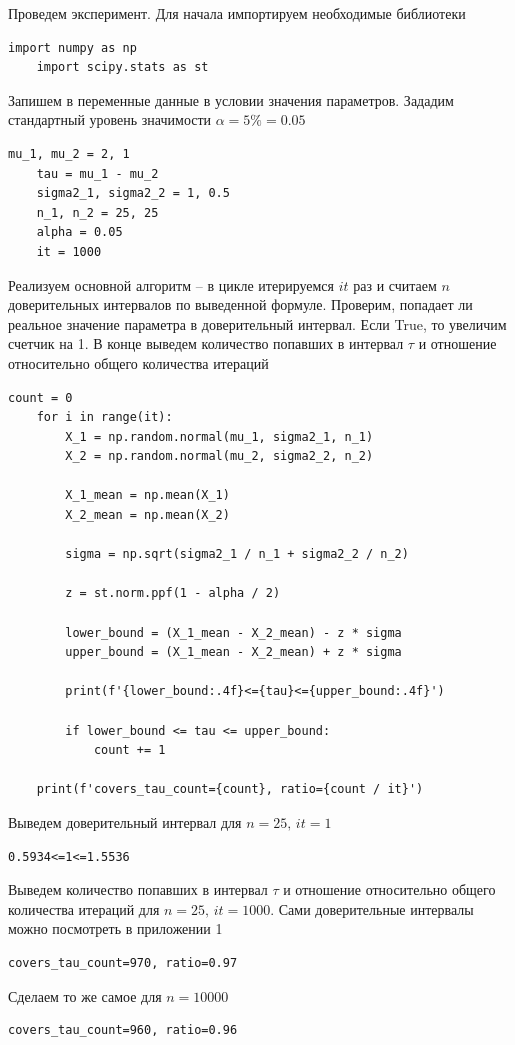 \documentclass[a4paper, 12pt]{article}
\begin{document}
    Проведем эксперимент. Для начала импортируем необходимые библиотеки
    \begin{lstlisting}[label=imps1, caption={Импортирование необходимых библиотек}]
    import numpy as np
    import scipy.stats as st
    \end{lstlisting}
    Запишем в переменные данные в условии значения параметров. Зададим стандартный уровень значимости $\alpha=5\%=0.05$
    \begin{lstlisting}[label=vars, caption={Задаем данные по условию}]
    mu_1, mu_2 = 2, 1
    tau = mu_1 - mu_2
    sigma2_1, sigma2_2 = 1, 0.5
    n_1, n_2 = 25, 25
    alpha = 0.05
    it = 1000
    \end{lstlisting}
    Реализуем основной алгоритм -- в цикле итерируемся $it$ раз и считаем $n$ доверительных интервалов по выведенной формуле.
    Проверим, попадает ли реальное значение параметра в доверительный интервал. Если True, то увеличим счетчик на 1. В конце
    выведем количество попавших в интервал $\tau$ и отношение относительно общего количества итераций
    \begin{lstlisting}[label=code1, caption={Код для подсчета доверительных интервалов и кол-ва попаданий}]
    count = 0
    for i in range(it):
        X_1 = np.random.normal(mu_1, sigma2_1, n_1)
        X_2 = np.random.normal(mu_2, sigma2_2, n_2)
        
        X_1_mean = np.mean(X_1)
        X_2_mean = np.mean(X_2)
        
        sigma = np.sqrt(sigma2_1 / n_1 + sigma2_2 / n_2)
        
        z = st.norm.ppf(1 - alpha / 2)
        
        lower_bound = (X_1_mean - X_2_mean) - z * sigma
        upper_bound = (X_1_mean - X_2_mean) + z * sigma

        print(f'{lower_bound:.4f}<={tau}<={upper_bound:.4f}')
            
        if lower_bound <= tau <= upper_bound:
            count += 1
        
    print(f'covers_tau_count={count}, ratio={count / it}')
    \end{lstlisting}


    Выведем доверительный интервал для $n=25,\,it=1$
    \begin{lstlisting}[label=res1, caption={Посчитанный доверительный интервал}]
    0.5934<=1<=1.5536
    \end{lstlisting}
    Выведем количество попавших в интервал $\tau$ и отношение относительно общего количества итераций
    для $n=25,\,it=1000$. Сами доверительные интервалы можно посмотреть в приложении 1
    \begin{lstlisting}[label=n25, caption={95-\% доверительный интервал для $n=25$}]
    covers_tau_count=970, ratio=0.97
    \end{lstlisting}
    Сделаем то же самое для $n=10000$
    \begin{lstlisting}[label=n10000, caption={95-\% доверительный интервал для $n=10000$}]
    covers_tau_count=960, ratio=0.96
    \end{lstlisting}
\end{document}
